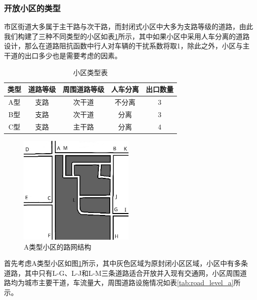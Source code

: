 \documentclass[fontset=windows,a4paper,12pt]{ctexart}
\begin{document}
		\subsubsection{开放小区的类型}
		市区街道大多属于主干路与次干路，而封闭式小区中大多为支路等级的道路，由此我们构建了三种不同类型的小区如表\ref{tab:apartment_type}所示，其中如果小区中采用人车分离的道路设计，那么在道路阻抗函数中行人对车辆的干扰系数将取1，除此之外，小区与主干道的出口多少也是需要考虑的因素。
		\begin{table}[!htbp]
			\centering
			\caption{小区类型表}
			\label{tab:apartment_type}
			\begin{tabular}{c|cccc}
				\toprule[1pt] 
				类型 & 道路等级 & 周围道路等级 & 人车分离 & 出口数量 \\ 
				\hline 
				A型 & 支路 & 次干道 & 不分离 &  3\\ 
				B型 & 支路 & 次干道 &  分离&  3\\ 
				C型 & 支路 & 主干路 &  分离&  4\\ 
				\bottomrule[1pt]
				\end{tabular} 
		\end{table}
		\begin{figure}[!htbp]
			\centering
			\includegraphics[width=0.5\textwidth]{pic/net_a.jpg}
			\caption{A类型小区的路网结构}
			\label{fig:net_a}
		\end{figure}		
		
		首先考虑A类型小区如图\ref{fig:net_a}所示，其中灰色区域为原封闭小区区域，小区中有多条道路，其中只有L-G、L-J和L-M三条道路适合开放并入现有交通网，小区周围道路均为城市主要干道，车流量大，周围道路设施情况如表\ref{tab:road_level_a}所示。
		
\end{document}
